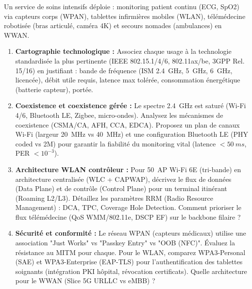 \documentclass[11pt]{article}
\begin{document}
\begin{exercice}
Un service de soins intensifs déploie : monitoring patient continu (ECG, SpO2) via capteurs corps (WPAN), tablettes infirmières mobiles (WLAN), télémédecine robotisée (bras articulé, caméra 4K) et secours nomades (ambulances) en WWAN.
\begin{enumerate}
    \item \textbf{Cartographie technologique :} Associez chaque usage à la technologie standardisée la plus pertinente (IEEE 802.15.1/4/6, 802.11ax/be, 3GPP Rel. 15/16) en justifiant : bande de fréquence (ISM \SI{2.4}{\giga\hertz}, \SI{5}{\giga\hertz}, \SI{6}{\giga\hertz}, licencée), débit utile requis, latence max tolérée, consommation énergétique (batterie capteur), portée.
    \item \textbf{Coexistence et coexistence gérée :} Le spectre \SI{2.4}{\giga\hertz} est saturé (Wi-Fi 4/6, Bluetooth LE, Zigbee, micro-ondes). Analysez les mécanismes de coexistence (CSMA/CA, AFH, CCA, EDCA). Proposez un plan de canaux Wi-Fi (largeur \SI{20}{\mega\hertz} vs \SI{40}{\mega\hertz}) et une configuration Bluetooth LE (PHY coded vs 2M) pour garantir la fiabilité du monitoring vital (latence $< \SI{50}{ms}$, PER $< 10^{-3}$).
    \item \textbf{Architecture WLAN contrôleur :} Pour \SI{50}{AP} Wi-Fi 6E (tri-bande) en architecture centralisée (WLC + CAPWAP), décrivez le flux de données (Data Plane) et de contrôle (Control Plane) pour un terminal itinérant (Roaming L2/L3). Détaillez les paramètres RRM (Radio Resource Management) : DCA, TPC, Coverage Hole Detection. Comment prioriser le flux télémédecine (QoS WMM/802.11e, DSCP EF) sur le backbone filaire ?
    \item \textbf{Sécurité et conformité :} Le réseau WPAN (capteurs médicaux) utilise une association "Just Works" vs "Passkey Entry" vs "OOB (NFC)". Évaluez la résistance au MITM pour chaque. Pour le WLAN, comparez WPA3-Personal (SAE) et WPA3-Enterprise (EAP-TLS) pour l'authentification des tablettes soignants (intégration PKI hôpital, révocation certificats). Quelle architecture pour le WWAN (Slice 5G URLLC vs eMBB) ?
\end{enumerate}
\end{exercice}
\end{document}
